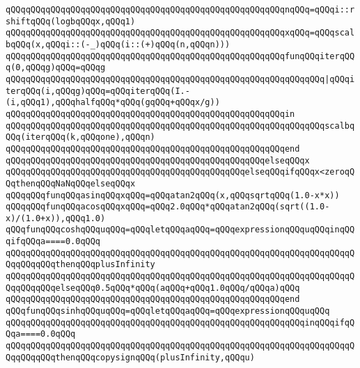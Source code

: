 \verb|qQQqqQQqqQQqqQQqqQQqqQQqqQQqqQQqqQQqqQQqqQQqqQQqqQQqqQQqnqQQq=qQQqi::rshiftqQQq(logbqQQqx,qQQq1)|\newline
\verb|qQQqqQQqqQQqqQQqqQQqqQQqqQQqqQQqqQQqqQQqqQQqqQQqqQQqqQQqxqQQq=qQQqscalbqQQq(x,qQQqi::(-_)qQQq(i::(+)qQQq(n,qQQqn)))|\newline
\verb|qQQqqQQqqQQqqQQqqQQqqQQqqQQqqQQqqQQqqQQqqQQqqQQqqQQqqQQqfunqQQqiterqQQq(0,qQQqg)qQQq=qQQqg|\newline
\verb|qQQqqQQqqQQqqQQqqQQqqQQqqQQqqQQqqQQqqQQqqQQqqQQqqQQqqQQqqQQqqQQq|\verb#|qQQqiterqQQq(i,qQQqg)qQQq=qQQqiterqQQq(I.-(i,qQQq1),qQQqhalfqQQq*qQQq(gqQQq+qQQqx/g))#\newline
\verb|qQQqqQQqqQQqqQQqqQQqqQQqqQQqqQQqqQQqqQQqqQQqqQQqqQQqqQQqin|\newline
\verb|qQQqqQQqqQQqqQQqqQQqqQQqqQQqqQQqqQQqqQQqqQQqqQQqqQQqqQQqqQQqqQQqscalbqQQq(iterqQQq(k,qQQqone),qQQqn)|\newline
\verb|qQQqqQQqqQQqqQQqqQQqqQQqqQQqqQQqqQQqqQQqqQQqqQQqqQQqqQQqend|\newline
\verb|qQQqqQQqqQQqqQQqqQQqqQQqqQQqqQQqqQQqqQQqqQQqqQQqqQQqelseqQQqx|\newline
\verb|qQQqqQQqqQQqqQQqqQQqqQQqqQQqqQQqqQQqqQQqqQQqqQQqelseqQQqifqQQqx<zeroqQQqthenqQQqNaNqQQqelseqQQqx|\newline
\newline
\verb|qQQqqQQqfunqQQqasinqQQqxqQQq=qQQqatan2qQQq(x,qQQqsqrtqQQq(1.0-x*x))|\newline
\verb|qQQqqQQqfunqQQqacosqQQqxqQQq=qQQq2.0qQQq*qQQqatan2qQQq(sqrt((1.0-x)/(1.0+x)),qQQq1.0)|\newline
\newline
\verb|qQQqfunqQQqcoshqQQquqQQq=qQQqletqQQqaqQQq=qQQqexpressionqQQquqQQqinqQQqifqQQqa====0.0qQQq|\newline
\verb|qQQqqQQqqQQqqQQqqQQqqQQqqQQqqQQqqQQqqQQqqQQqqQQqqQQqqQQqqQQqqQQqqQQqqQQqqQQqqQQqthenqQQqplusInfinity|\newline
\verb|qQQqqQQqqQQqqQQqqQQqqQQqqQQqqQQqqQQqqQQqqQQqqQQqqQQqqQQqqQQqqQQqqQQqqQQqqQQqqQQqelseqQQq0.5qQQq*qQQq(aqQQq+qQQq1.0qQQq/qQQqa)qQQq|\newline
\verb|qQQqqQQqqQQqqQQqqQQqqQQqqQQqqQQqqQQqqQQqqQQqqQQqqQQqqQQqend|\newline
\verb|qQQqfunqQQqsinhqQQquqQQq=qQQqletqQQqaqQQq=qQQqexpressionqQQquqQQq|\newline
\verb|qQQqqQQqqQQqqQQqqQQqqQQqqQQqqQQqqQQqqQQqqQQqqQQqqQQqqQQqqQQqinqQQqifqQQqa====0.0qQQq|\newline
\verb|qQQqqQQqqQQqqQQqqQQqqQQqqQQqqQQqqQQqqQQqqQQqqQQqqQQqqQQqqQQqqQQqqQQqqQQqqQQqqQQqthenqQQqcopysignqQQq(plusInfinity,qQQqu)|\newline
